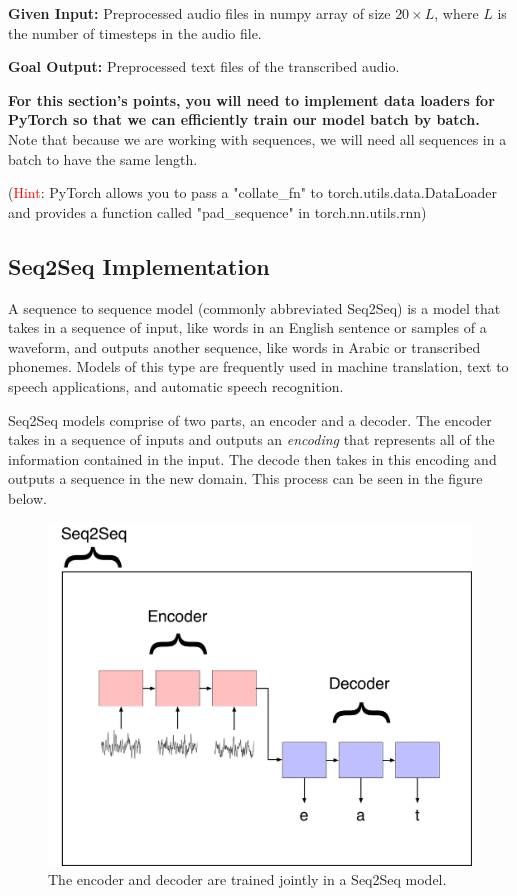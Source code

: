 \documentclass[11pt,addpoints,answers]{exam}
\numberwithin{equation}{section} %
\numberwithin{figure}{section} %
\numberwithin{table}{section} %
\begin{document}
\textbf{Given Input:} Preprocessed audio files in numpy array of size $20 \times L$, where $L$ is the number of timesteps in the audio file. 

\textbf{Goal Output:} Preprocessed text files of the transcribed audio. 

\textbf{For this section's points, you will need to implement data loaders for PyTorch so that we can efficiently train our model batch by batch.} Note that because we are working with sequences, we will need all sequences in a batch to have the same length. 

(\textcolor{red}{Hint}: PyTorch allows you to pass a "collate\_fn" to torch.utils.data.DataLoader and provides a function called "pad\_sequence" in torch.nn.utils.rnn)  

\subsection{Seq2Seq Implementation}

A sequence to sequence model (commonly abbreviated Seq2Seq) is a model that takes in a sequence of input, like words in an English sentence or samples of a waveform, and outputs another sequence, like words in Arabic or transcribed phonemes. Models of this type are frequently used in machine translation, text to speech applications, and automatic speech recognition. 

Seq2Seq models comprise of two parts, an encoder and a decoder. The encoder takes in a sequence of inputs and outputs an \textit{encoding} that represents all of the information contained in the input. The decode then takes in this encoding and outputs a sequence in the new domain. This process can be seen in the figure below. 

\begin{figure}[h]
\centering
\includegraphics[width=0.75\linewidth]{fig/seq2seq_illustration.jpg}
\caption{The encoder and decoder are trained jointly in a Seq2Seq model.}
\label{learned_interp}
\end{figure}
\end{document}
